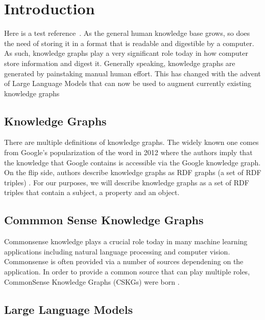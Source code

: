 \documentclass[\main/thesis.tex]{subfiles}
\begin{document}
\chapter{Introduction}

Here is a test reference~\cite{west_symbolic_2021}.
As the general human knowledge base grows, so does the need of storing it in a format that
is readable and digestible by a computer. As such, knowledge graphs play a very significant role
today in how computer store information and digest it. Generally speaking, knowledge graphs are 
generated by painstaking manual human effort. This has changed with the advent of Large 
Language Models that can now be used to augment currently existing knowledge graphs \cite{west_symbolic_2021}


\section{Knowledge Graphs}\label{sec:knowledgeGraphs}

There are multiple definitions of knowledge graphs. The widely known one comes from Google's 
popularization of the word in 2012 \cite{noauthor_introducing_2012} where the authors imply 
that the knowledge that Google contains is accessible via the Google knowledge graph. On the 
flip side, authors describe knowledge graphs as RDF graphs (a set of RDF triples) \cite{farber_linked_2017}. 
For our purposes, we will describe knowledge graphs as a set of RDF triples that contain 
a subject, a property and an object. 

\section{Commmon Sense Knowledge Graphs}\label{sec:commonsenseKnowledgeGraphs}

Commonsense knowledge plays a crucial role today in many machine learning applications including
natural language processing and computer vision. Commonsense is often provided via a number 
of sources dependening on the application. In order to provide a common source that can play
multiple roles, CommonSense Knowledge Graphs (CSKGs) were born \cite{ilievski_cskg_2021}.

\section{Large Language Models}\label{sec:largeLanguageModel}
\end{document}
